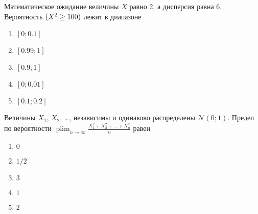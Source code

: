 \documentclass[t]{beamer}
\DeclareMathOperator*\plim{plim}
\let\P\relax
\DeclareMathOperator{\P}{\mathbb{P}}
\newcommand{\cN}{\mathcal{N}}
\begin{document}
 \begin{frame} \label{34} 
\begin{block}{34} 

Математическое ожидание величины $X$ равно 2, а дисперсия равна 6. Вероятность $\P(X^2 \geq 100)$ лежит в диапазоне
  


 \end{block} 
\begin{enumerate} 
\item[] \hyperlink{34-Yes}{\beamergotobutton{} $[0;0.1]$}
\item[] \hyperlink{34-No}{\beamergotobutton{} $[0.99;1]$}
\item[] \hyperlink{34-No}{\beamergotobutton{} $[0.9;1]$}
\item[] \hyperlink{34-No}{\beamergotobutton{} $[0;0.01]$}
\item[] \hyperlink{34-No}{\beamergotobutton{} $[0.1;0.2]$}
\end{enumerate} 
\end{frame} 


 \begin{frame} \label{35} 
\begin{block}{35} 

Величины $X_1$, $X_2$, \ldots, независимы и одинаково распределены $\cN(0;1)$. Предел по вероятности $\plim_{n\to\infty} \frac{X_1^2+ X_2^2 + \ldots + X_n^2}{n}$ равен
 


 \end{block} 
\begin{enumerate} 
\item[] \hyperlink{35-No}{\beamergotobutton{} $0$}
\item[] \hyperlink{35-No}{\beamergotobutton{} $1/2$}
\item[] \hyperlink{35-No}{\beamergotobutton{} $3$}
\item[] \hyperlink{35-Yes}{\beamergotobutton{} $1$}
\item[] \hyperlink{35-No}{\beamergotobutton{} $2$}
\end{enumerate} 
\end{frame} 
\end{document}
